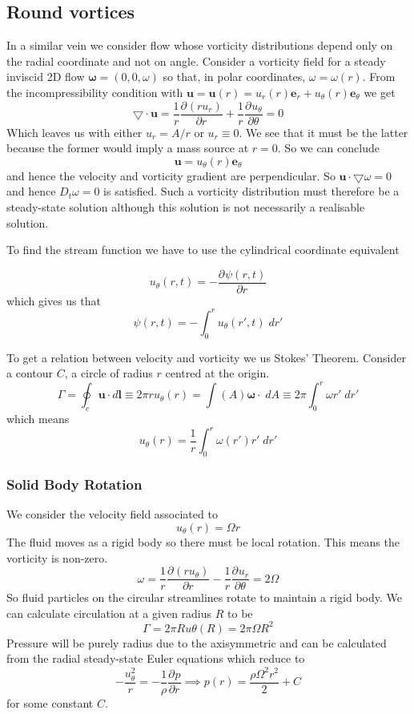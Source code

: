 \documentclass[11pt]{article}
\newcommand*{\pd}[3][]{\ensuremath{\frac{\partial^{#1} {#2}}{\partial {#3}^{#1}}}}
\newcommand{\grad}{\bigtriangledown}
\newcommand{\mv}[1]{\bm{#1}}
\newenvironment{formula}
	{\begin{mdframed}[backgroundcolor=white, roundcorner=5pt, linewidth=1pt, linecolor=red]}
	{\end{mdframed}}
\begin{document}
\subsection{Round vortices}
In a similar vein we consider flow whose vorticity distributions depend only on the radial coordinate and not on angle.
Consider a vorticity field for a steady inviscid 2D flow $\mv{\omega}= (0, 0, \omega)$ so that, in polar coordinates, $\omega=\omega(r)$.
From the incompressibility condition with $\mv{u}=\mv{u}(r)=u_r(r)\mv{e}_r + u_\theta(r)\mv{e}_\theta$ we get
\[
	\grad\cdot\mv{u} = \frac{1}{r}\pd{(ru_r)}{r}+\frac{1}{r}\pd{u_\theta}{\theta}=0
\]
Which leaves us with either $u_r=A/r$ or $u_r\equiv 0$.
We see that it must be the latter because the former would imply a mass source at $r=0$.
So we can conclude
\[
	\mv{u} = u_\theta(r) \mv{e}_\theta
\]
and hence the velocity and vorticity gradient are perpendicular.
So $\mv{u}\cdot\grad\omega = 0$ and hence $D_t\omega = 0$ is satisfied.
Such a vorticity distribution must therefore be a steady-state solution although this solution is not necessarily a realisable solution.

To find the stream function we have to use the cylindrical coordinate equivalent
\begin{formula}
	\[
		u_\theta(r, t) = - \pd{\psi(r, t)}{r}
	\]
	which gives us that
	\[
		\psi(r, t) = - \int_0^r u_\theta(r', t) \;dr'
	\]
\end{formula}
To get a relation between velocity and vorticity we us Stokes' Theorem.
Consider a contour $C$, a circle of radius $r$ centred at the origin.
\[
	\Gamma = \oint_c \mv{u}\cdot d\mv{l} \equiv 2\pi r u_\theta (r) = \int(A) \mv{\omega}\cdot\mv{} \; dA \equiv 2\pi \int_0^r \omega r'\;dr'
\]
which means
\[
	u_\theta(r) = \frac{1}{r}\int_0^r \omega(r') r' \; dr'
\]
\subsubsection{Solid Body Rotation}
We consider the velocity field associated to
\[
	u_\theta(r) = \Omega r
\]
The fluid moves as a rigid body so there must be local rotation.
This means the vorticity is non-zero.
\[
	\omega = \frac{1}{r}\pd{(r u_\theta)}{r}-\frac{1}{r}\pd{u_r}{\theta} = 2\Omega
\]
So fluid particles on the circular streamlines rotate to maintain a rigid body.
We can calculate circulation at a given radius $R$ to be
\[
	\Gamma = 2\pi R u\theta(R) = 2\pi \Omega R^2
\]
Pressure will be purely radius due to the axisymmetric and can be calculated from the radial steady-state Euler equations which reduce to
\[
	-\frac{u_\theta^2}{r}=-\frac{1}{\rho}\pd{p}{r} \implies p(r) = \frac{\rho\Omega^2 r^2}{2} +C
\]
for some constant $C$.
\end{document}
